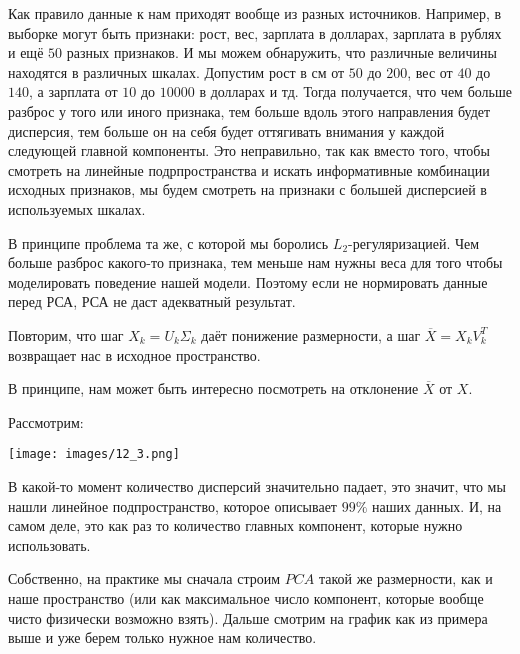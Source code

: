 \begin{example}[Проблема]
Как правило данные к нам приходят вообще из разных источников. Например, в выборке могут быть признаки: рост, вес, зарплата в долларах, зарплата в рублях и ещё $50$ разных признаков. И мы можем обнаружить, что различные величины находятся в различных шкалах. Допустим рост в см от $50$ до $200$, вес от $40$ до $140$, а зарплата от $10$ до $10000$ в долларах и тд. Тогда получается, что чем больше разброс у того или иного признака, тем больше вдоль этого направления будет дисперсия, тем больше он на себя будет оттягивать внимания у каждой следующей главной компоненты. Это неправильно, так как вместо того, чтобы смотреть на линейные подрпространства и искать информативные комбинации исходных признаков, мы будем смотреть на признаки с большей дисперсией в используемых шкалах.
\end{example}

\begin{note}[Важно]
В принципе проблема та же, с которой мы боролись $L_2$-регуляризацией. Чем больше разброс какого-то признака, тем меньше нам нужны веса для того чтобы моделировать поведение нашей модели. Поэтому если не нормировать данные перед РСА, РСА не даст адекватный результат.
\end{note}

Повторим, что шаг $X_k = U_k \Sigma_k$ даёт понижение размерности, а шаг $\overline{X} = X_kV_k^T$ возвращает нас в исходное пространство.

В принципе, нам может быть интересно посмотреть на отклонение $\overline{X}$ от $X$.

\begin{example}
    Рассмотрим:
    \begin{center}
    \texttt{[image: images/12\_3.png]}
    \end{center}

    В какой-то момент количество дисперсий значительно падает, это значит, что мы нашли линейное подпространство, которое описывает $99\%$ наших данных. И, на самом деле, это как раз то количество главных компонент, которые нужно использовать.
\end{example}

Собственно, на практике мы сначала строим $PCA$ такой же размерности, как и наше пространство (или как максимальное число компонент, которые вообще чисто физически возможно взять). Дальше смотрим на график как из примера выше и уже берем только нужное нам количество.

